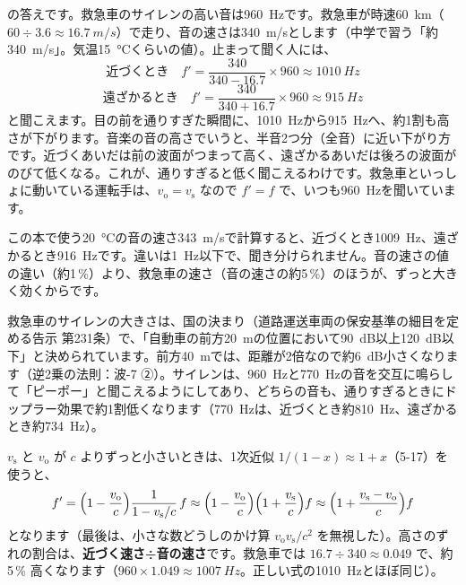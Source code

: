 \label{ph:波-8:hatena}\bkhatenaref の答えです。救急車のサイレンの高い音は\qty{960}{Hz}です。救急車が時速\qty{60}{km}（$60\div3.6\approx\qty{16.7}{m/s}$）で走り、音の速さは\qty{340}{m/s}とします（中学で習う「約\qty{340}{m/s}」。気温\qty{15}{\celsius}くらいの値）。止まって聞く人には、
\[\text{近づくとき}\quad f'=\frac{340}{340-16.7}\times960\approx\qty{1010}{Hz}\]
\[\text{遠ざかるとき}\quad f'=\frac{340}{340+16.7}\times960\approx\qty{915}{Hz}\]
と聞こえます。目の前を通りすぎた瞬間に、\qty{1010}{Hz}から\qty{915}{Hz}へ、約1割も高さが下がります。音楽の音の高さでいうと、半音2つ分（全音）に近い下がり方です。近づくあいだは前の波面がつまって高く、遠ざかるあいだは後ろの波面がのびて低くなる。これが、通りすぎると低く聞こえるわけです。救急車といっしょに動いている運転手は、$v_{\mathrm o}=v_{\mathrm s}$ なので $f'=f$ で、いつも\qty{960}{Hz}を聞いています。

この本で使う\qty{20}{\celsius}の音の速さ\qty{343}{m/s}で計算すると、近づくとき\qty{1009}{Hz}、遠ざかるとき\qty{916}{Hz}です。違いは\qty{1}{Hz}以下で、聞き分けられません。音の速さの値の違い（約1\,\%）より、救急車の速さ（音の速さの約5\,\%）のほうが、ずっと大きく効くからです。

\begin{phmijika}[サイレンの大きさの決まり]
救急車のサイレンの大きさは、国の決まり（道路運送車両の保安基準の細目を定める告示 第231条）で、「自動車の前方\qty{20}{m}の位置において\qty{90}{dB}以上\qty{120}{dB}以下」と決められています。前方\qty{40}{m}では、距離が2倍なので約\qty{6}{dB}小さくなります（逆2乗の法則：波-7 ②）。サイレンは、\qty{960}{Hz}と\qty{770}{Hz}の音を交互に鳴らして「ピーポー」と聞こえるようにしてあり、どちらの音も、通りすぎるときにドップラー効果で約1割低くなります（\qty{770}{Hz}は、近づくとき約\qty{810}{Hz}、遠ざかるとき約\qty{734}{Hz}）。
\end{phmijika}

$v_{\mathrm s}$ と $v_{\mathrm o}$ が $c$ よりずっと小さいときは、1次近似 $1/(1-x)\approx1+x$（5-17）を使うと、
\[f'=\Bigl(1-\frac{v_{\mathrm o}}{c}\Bigr)\frac{1}{1-v_{\mathrm s}/c}\,f\approx\Bigl(1-\frac{v_{\mathrm o}}{c}\Bigr)\Bigl(1+\frac{v_{\mathrm s}}{c}\Bigr)f\approx\Bigl(1+\frac{v_{\mathrm s}-v_{\mathrm o}}{c}\Bigr)f\]
となります（最後は、小さな数どうしのかけ算 $v_{\mathrm o}v_{\mathrm s}/c^2$ を無視した）。高さのずれの割合は、\textbf{近づく速さ÷音の速さ}です。救急車では $16.7\div340\approx0.049$ で、約5\,\% 高くなります（$960\times1.049\approx\qty{1007}{Hz}$。正しい式の\qty{1010}{Hz}とほぼ同じ）。

